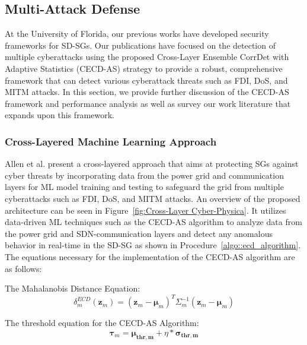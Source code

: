 \documentclass[conference]{IEEEtran}
\begin{document}
\subsection{Multi-Attack Defense}
\label{Multi-Attack Defense}
At the University of Florida, our previous works \cite{starke2022cross,agnew2022implementation,aljohanicross,nagaraj2020ensemble,trevizan2019data,ruben2020hybrid} have developed security frameworks for SD-SGs. Our publications \cite{starke2022cross,agnew2022implementation } have focused on the detection of multiple cyberattacks using the proposed Cross-Layer Ensemble CorrDet with Adaptive Statistics (CECD-AS) strategy to provide a robust, comprehensive framework that can detect various cyberattack threats such as FDI, DoS, and MITM attacks. In this section, we provide further discussion of the CECD-AS framework and performance analysis as well as survey our work literature that expands upon this framework.





\subsubsection{Cross-Layered Machine Learning Approach}  Allen et al. \cite{starke2022cross} present a cross-layered approach that aims at protecting SGs against cyber threats by incorporating data from the power grid and communication layers for ML model training and testing to safeguard the grid from multiple cyberattacks such as FDI, DoS, and MITM attacks. An overview of the proposed architecture can be seen in Figure~\ref{fig:Cross-Layer Cyber-Physica}. It utilizes data-driven ML techniques such as the CECD-AS algorithm to analyze data from the power grid and SDN-communication layers and detect any anomalous behavior in real-time in the SD-SG as shown in Procedure~\ref{algo::ecd_algorithm}. The equations necessary for the implementation of the CECD-AS algorithm are as follows:

The Mahalanobis Distance Equation: 
\begin{equation} \label{ECorrDet-algorithm} \delta_{m}^{ECD}(\mathbf{z}_{m})={(\mathbf{z}_{m}-\mathbf{\mu}_{m})}^T \Sigma_{m}^{-1} (\mathbf{z}_{m}-\mathbf{\mu}_{m}) \end{equation}

The threshold equation for the CECD-AS Algorithm:
\begin{equation} \label{eq:threshold_noadapt} 
\mathbf{\tau}_m = \mathbf{\mu_{thr,m}} + \eta * \mathbf{\sigma_{thr,m}} 
\end{equation}
\end{document}
